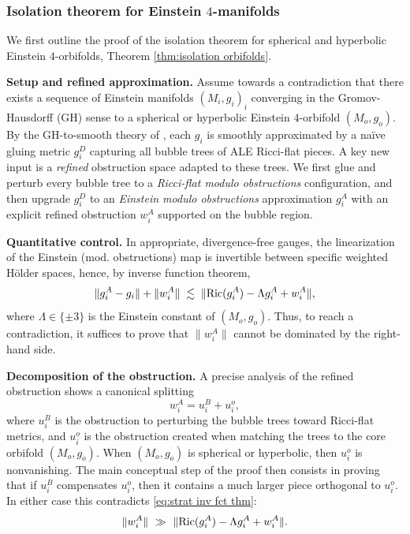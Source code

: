 \documentclass[11pt,reqno]{amsart}
\numberwithin{equation}{section}
\newcommand{\Ric}{{\rm Ric}}
\theoremstyle{definition}
\theoremstyle{remark}
\begin{document}
\subsubsection{Isolation theorem for Einstein $4$-manifolds}

We first outline the proof of the isolation theorem for spherical and hyperbolic Einstein $4$-orbifolds, Theorem \ref{thm:isolation orbifolds}.

\noindent\textbf{Setup and refined approximation.}
Assume towards a contradiction that there exists a sequence of Einstein manifolds $(M_i,g_i)_i$ converging in the Gromov-Hausdorff (GH) sense to a spherical or hyperbolic Einstein $4$-orbifold $(M_o,g_o)$. By the GH-to-smooth theory of \cite{ozu1,ozu2}, each $g_i$ is smoothly approximated by a naïve gluing metric $g_i^D$ capturing all bubble trees of ALE Ricci-flat pieces. A key new input is a \emph{refined} obstruction space adapted to these trees. We first glue and perturb every bubble tree to a \emph{Ricci-flat modulo obstructions} configuration, and then upgrade $g_i^D$ to an \emph{Einstein modulo obstructions} approximation $g_i^A$ with an explicit refined obstruction $w_i^A$ supported on the bubble region.

\noindent\textbf{Quantitative control.}
In appropriate, divergence-free gauges, the linearization of the Einstein (mod. obstructions) map is invertible between specific weighted Hölder spaces, hence, by inverse function theorem,
\begin{equation}\label{eq:strat inv fct thm}
  \|g_i^A-g_i\|+\|w_i^A\|\;\lesssim\;\|\Ric(g_i^A)-\Lambda g_i^A + w_i^A\|,
\end{equation}
where $\Lambda\in\{\pm3\}$ is the Einstein constant of $(M_o,g_o)$. Thus, to reach a contradiction, it suffices to prove that $\|w_i^A\|$ cannot be dominated by the right-hand side.

\noindent\textbf{Decomposition of the obstruction.}
A precise analysis of the refined obstruction shows a canonical splitting
  $$w_i^A = u_i^B + u_i^o,$$
where $u_i^B$ is the obstruction to perturbing the bubble trees toward Ricci-flat metrics, and $u_i^o$ is the obstruction created when matching the trees to the core orbifold $(M_o,g_o)$. When $(M_o,g_o)$ is spherical or hyperbolic, then $u_i^o$ is nonvanishing. The main conceptual step of the proof then consists in proving that if $u_i^B$ compensates $u_i^o$, then it contains a much larger piece orthogonal to $u_i^o$. In either case this contradicts \eqref{eq:strat inv fct thm}:
  $$\|w_i^A\|\  \gg\ \|\Ric(g_i^A)-\Lambda g_i^A + w_i^A\|.$$ 
\end{document}
